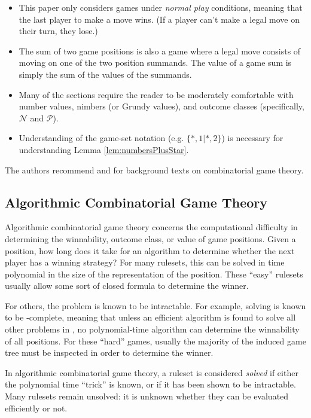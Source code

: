 \documentclass[letter,10pt]{article}
\newcommand{\fuzzy}{\ensuremath{\mathcal{N}}}
\newcommand{\zero}{\ensuremath{\mathcal{P}}}
\begin{document}
\begin{itemize}
    \item  This paper only considers games under \emph{normal play} conditions, meaning that the last player to make a move wins.  (If a player can't make a legal move on their turn, they lose.)
    \item  The sum of two game positions is also a game where a legal move consists of moving on one of the two position summands.  The value of a game sum is simply the sum of the values of the summands.
    \item  Many of the sections require the reader to be moderately comfortable with number values, nimbers (or Grundy values), and outcome classes (specifically, $\fuzzy$ and $\zero$).
    \item Understanding of the game-set notation (e.g. $\{*, 1 | *, 2\}$) is necessary for understanding Lemma \ref{lem:numbersPlusStar}.
\end{itemize}

The authors recommend \cite{LessonsInPlay:2007} and \cite{WinningWays:2001} for background texts on combinatorial game theory.

\subsection{Algorithmic Combinatorial Game Theory}

Algorithmic combinatorial game theory concerns the computational difficulty in determining the winnability, outcome class, or value of game positions.  Given a position, how long does it take for an algorithm to determine whether the next player has a winning strategy?  For many rulesets, this can be solved in time polynomial in the size of the representation of the position.  These ``easy'' rulesets usually allow some sort of closed formula to determine the winner.

For others, the problem is known to be intractable.  For example, solving  is known to be -complete\cite{DBLP:journals/jcss/Schaefer78}, meaning that unless an efficient algorithm is found to solve all other problems in , no polynomial-time algorithm can determine the winnability of all  positions.  For these ``hard'' games, usually the majority of the induced game tree must be inspected in order to determine the winner.

In algorithmic combinatorial game theory, a ruleset is considered \emph{solved} if either the polynomial time ``trick'' is known, or if it has been shown to be intractable.  Many rulesets remain unsolved: it is unknown whether they can be evaluated efficiently or not.
\end{document}
